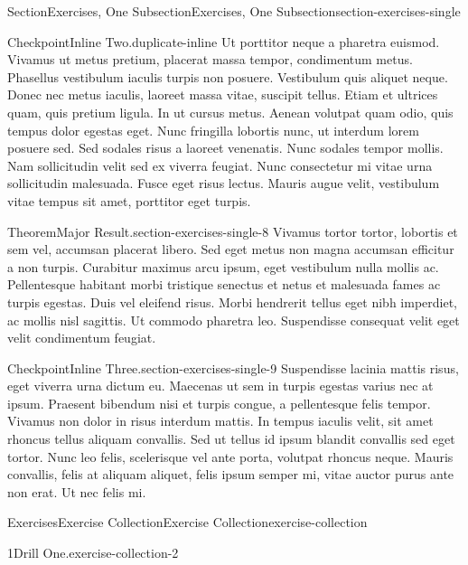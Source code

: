 \documentclass[oneside,10pt,]{article}
\numberwithin{equation}{section}
\begin{document}
\begin{sectionptx}{Section}{Exercises, One Subsection}{}{Exercises, One Subsection}{}{}{section-exercises-single}
\begin{inlineexercise}{Checkpoint}{Inline Two.}{duplicate-inline}%
Ut porttitor neque a pharetra euismod. Vivamus ut metus pretium, placerat massa tempor, condimentum metus. Phasellus vestibulum iaculis turpis non posuere. Vestibulum quis aliquet neque. Donec nec metus iaculis, laoreet massa vitae, suscipit tellus. Etiam et ultrices quam, quis pretium ligula. In ut cursus metus. Aenean volutpat quam odio, quis tempus dolor egestas eget. Nunc fringilla lobortis nunc, ut interdum lorem posuere sed. Sed sodales risus a laoreet venenatis. Nunc sodales tempor mollis. Nam sollicitudin velit sed ex viverra feugiat. Nunc consectetur mi vitae urna sollicitudin malesuada. Fusce eget risus lectus. Mauris augue velit, vestibulum vitae tempus sit amet, porttitor eget turpis.%
\end{inlineexercise}%
\begin{theorem}{Theorem}{Major Result.}{}{section-exercises-single-8}%
Vivamus tortor tortor, lobortis et sem vel, accumsan placerat libero. Sed eget metus non magna accumsan efficitur a non turpis. Curabitur maximus arcu ipsum, eget vestibulum nulla mollis ac. Pellentesque habitant morbi tristique senectus et netus et malesuada fames ac turpis egestas. Duis vel eleifend risus. Morbi hendrerit tellus eget nibh imperdiet, ac mollis nisl sagittis. Ut commodo pharetra leo. Suspendisse consequat velit eget velit condimentum feugiat.%
\end{theorem}
\begin{inlineexercise}{Checkpoint}{Inline Three.}{section-exercises-single-9}%
Suspendisse lacinia mattis risus, eget viverra urna dictum eu. Maecenas ut sem in turpis egestas varius nec at ipsum. Praesent bibendum nisi et turpis congue, a pellentesque felis tempor. Vivamus non dolor in risus interdum mattis. In tempus iaculis velit, sit amet rhoncus tellus aliquam convallis. Sed ut tellus id ipsum blandit convallis sed eget tortor. Nunc leo felis, scelerisque vel ante porta, volutpat rhoncus neque. Mauris convallis, felis at aliquam aliquet, felis ipsum semper mi, vitae auctor purus ante non erat. Ut nec felis mi.%
\end{inlineexercise}%
%
%
\typeout{************************************************}
\typeout{************************************************}
%
\begin{exercises-subsection-numberless}{Exercises}{Exercise Collection}{}{Exercise Collection}{}{}{exercise-collection}
\begin{divisionexercise}{1}{Drill One.}{}{exercise-collection-2}%

\end{divisionexercise}
\end{exercises-subsection-numberless}
\end{sectionptx}
\end{document}
